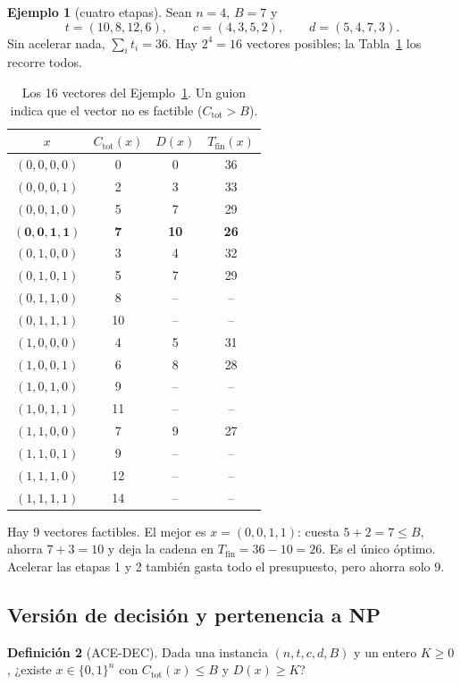 \documentclass[11pt,a4paper]{article}
\theoremstyle{definition}
\newtheorem{definicion}{Definición}[section]
\newtheorem{ejemplo}[definicion]{Ejemplo}
\newcommand{\Tfin}{T_{\mathrm{fin}}}
\newcommand{\Ctot}{C_{\mathrm{tot}}}
\newcommand{\ACE}{\textsf{ACE-DEC}}
\begin{document}
\begin{ejemplo}[cuatro etapas]\label{ej:p1}
Sean $n=4$, $B=7$ y
\[
t=(10,8,12,6),\qquad c=(4,3,5,2),\qquad d=(5,4,7,3).
\]
Sin acelerar nada, $\sum_i t_i=36$. Hay $2^4=16$ vectores posibles; la Tabla~\ref{tab:p1} los recorre todos.

\begin{table}[ht]
\centering
\small
\begin{tabular}{@{}cccc@{}}
\toprule
$x$ & $\Ctot(x)$ & $D(x)$ & $\Tfin(x)$ \\
\midrule
$(0,0,0,0)$ & 0 & 0 & 36 \\
$(0,0,0,1)$ & 2 & 3 & 33 \\
$(0,0,1,0)$ & 5 & 7 & 29 \\
$\mathbf{(0,0,1,1)}$ & \textbf{7} & \textbf{10} & \textbf{26} \\
$(0,1,0,0)$ & 3 & 4 & 32 \\
$(0,1,0,1)$ & 5 & 7 & 29 \\
$(0,1,1,0)$ & 8 & -- & -- \\
$(0,1,1,1)$ & 10 & -- & -- \\
$(1,0,0,0)$ & 4 & 5 & 31 \\
$(1,0,0,1)$ & 6 & 8 & 28 \\
$(1,0,1,0)$ & 9 & -- & -- \\
$(1,0,1,1)$ & 11 & -- & -- \\
$(1,1,0,0)$ & 7 & 9 & 27 \\
$(1,1,0,1)$ & 9 & -- & -- \\
$(1,1,1,0)$ & 12 & -- & -- \\
$(1,1,1,1)$ & 14 & -- & -- \\
\bottomrule
\end{tabular}
\caption{Los 16 vectores del Ejemplo~\ref{ej:p1}. Un guion indica que el vector no es factible ($\Ctot>B$).}
\label{tab:p1}
\end{table}

Hay 9 vectores factibles. El mejor es $x=(0,0,1,1)$: cuesta $5+2=7\le B$, ahorra $7+3=10$ y deja la cadena en $\Tfin=36-10=26$. Es el único óptimo. Acelerar las etapas 1 y 2 también gasta todo el presupuesto, pero ahorra solo $9$.
\end{ejemplo}

\subsection{Versión de decisión y pertenencia a NP}

\begin{definicion}[\ACE]
Dada una instancia $(n,t,c,d,B)$ y un entero $K\ge 0$, ¿existe $x\in\{0,1\}^n$ con $\Ctot(x)\le B$ y $D(x)\ge K$?
\end{definicion}
\end{document}
